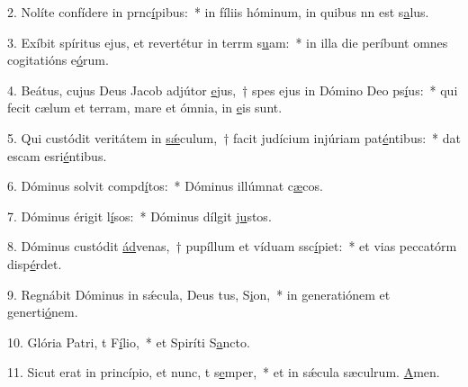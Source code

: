 2. Nolíte confídere in prnc\uline{í}pibus:~* in fíliis hóminum, in quibus nn est s\uline{a}lus.\par 
3. Exíbit spíritus ejus, et revertétur in terrm s\uline{u}am:~* in illa die períbunt omnes cogitatións e\uline{ó}rum.\par 
4. Beátus, cujus Deus Jacob adjútor \uline{e}jus,~† spes ejus in Dómino Deo ps\uline{í}us:~* qui fecit cælum et terram, mare et ómnia,  in \uline{e}is sunt.\par 
5. Qui custódit veritátem in \uline{sǽ}culum,~† facit judícium injúriam pat\uline{é}ntibus:~* dat escam esri\uline{é}ntibus.\par 
6. Dóminus solvit compd\uline{í}tos:~* Dóminus illúmnat c\uline{æ}cos.\par 
7. Dóminus érigit l\uline{í}sos:~* Dóminus dílgit j\uline{u}stos.\par 
8. Dóminus custódit \uline{ád}venas,~† pupíllum et víduam ssc\uline{í}piet:~* et vias peccatórm disp\uline{é}rdet.\par 
9. Regnábit Dóminus in sǽcula, Deus tus, S\uline{i}on,~* in generatiónem et generti\uline{ó}nem.\par 
10. Glória Patri, t F\uline{í}lio,~* et Spiríti S\uline{a}ncto.\par 
11. Sicut erat in princípio, et nunc, t s\uline{e}mper,~* et in sǽcula sæculrum. \uline{A}men.\par 

